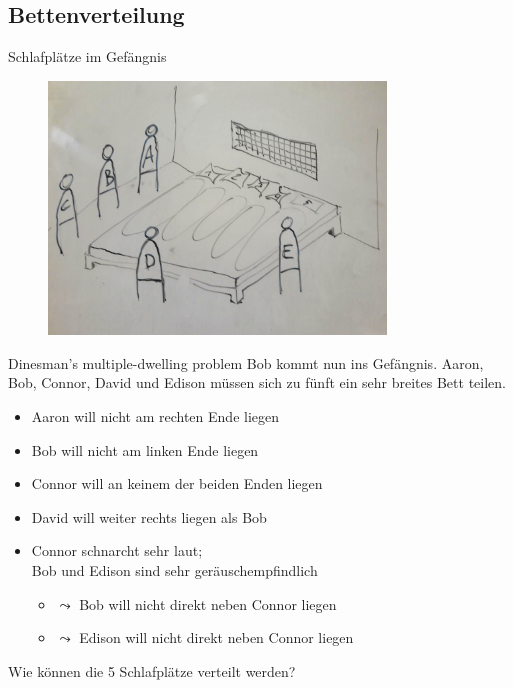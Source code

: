 \documentclass{beamer}
\begin{document}
\subsection{Bettenverteilung}

\begin{frame}{Schlafplätze im Gefängnis}
	\begin{figure}
		\includegraphics[width=0.8\textwidth]{images/bett}
	\end{figure}
\end{frame}

\begin{frame}{Dinesman's multiple-dwelling problem}
	Bob kommt nun ins Gefängnis.
	Aaron, Bob, Connor, David und Edison müssen sich zu fünft ein sehr breites Bett teilen.

	\begin{itemize}
		\item Aaron will nicht am rechten Ende liegen
		\item Bob will nicht am linken Ende liegen
		\item Connor will an keinem der beiden Enden liegen
		\item David will weiter rechts liegen als Bob
		\item Connor schnarcht sehr laut;\\Bob und Edison sind sehr geräuschempfindlich
		\begin{itemize}
			\item $\leadsto$ Bob will nicht direkt neben Connor liegen
			\item $\leadsto$ Edison will nicht direkt neben Connor liegen
		\end{itemize}
	\end{itemize}

	Wie können die 5 Schlafplätze verteilt werden?
\end{frame}
\end{document}
